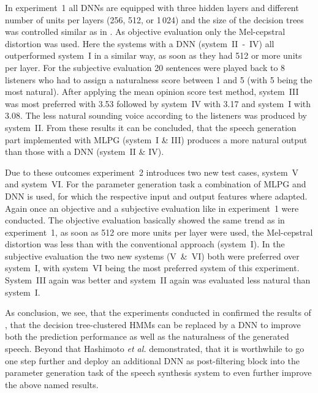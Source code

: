 In experiment~1 all \acp{DNN} are equipped with three hidden layers and different number of units per layers (256, 512, or 1\,024) and the size of the decision trees was controlled similar as in \cite{zen:deepstatistical}. As objective evaluation only the Mel-cepstral distortion was used. Here the systems with a \ac{DNN} (system~II~-~IV) all outperformed system~I in a similar way, as soon as they had 512 or more units per layer. For the subjective evaluation 20 sentences were played back to 8 listeners who had to assign a naturalness score between 1 and 5 (with 5 being the most natural). After applying the mean opinion score test method, system~III was most preferred with 3.53 followed by system~IV with 3.17 and system~I with 3.08. The less natural sounding voice according to the listeners was produced by system~II. From these results it can be concluded, that the speech generation part implemented with \ac{MLPG} (system~I \& III) produces a more natural output than those with a \ac{DNN} (system~II \& IV).

Due to these outcomes experiment~2 introduces two new test cases, system~V and system~VI. For the parameter generation task a combination of \ac{MLPG} and \ac{DNN} is used, for which the respective input and output features where adapted. Again once an objective and a subjective evaluation like in experiment~1 were conducted. The objective evaluation basically showed the same trend as in experiment~1, as soon as 512 ore more units per layer were used, the Mel-cepstral distortion was less than with the conventional approach (system~I). In the subjective evaluation the two new systems (V~\&~VI) both were preferred over system~I, with system~VI being the most preferred system of this experiment. System~III again was better and system~II again was evaluated less natural than system~I.

As conclusion, we see, that the experiments conducted in \cite{hashimoto:effect} confirmed the results of \cite{zen:deepstatistical}, that the decision tree-clustered \acp{HMM} can be replaced by a \ac{DNN} to improve both the prediction performance as well as the naturalness of the generated speech. Beyond that Hashimoto \textit{et al.} demonstrated, that it is worthwhile to go one step further and deploy an additional \ac{DNN} as post-filtering block into the parameter generation task of the speech synthesis system to even further improve the above named results.


